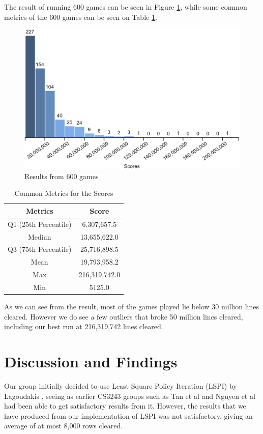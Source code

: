 \documentclass[a4paper,12pt,twocolumn]{article}
\begin{document}
The result of running 600 games can be seen in Figure \ref{score_histogram},
while some common metrics of the 600 games can be seen on Table \ref{metric_scores}.

\begin{figure}[h]
    \centering
    \includegraphics[scale=0.15]{games_600_histogram.png}
    \caption{Results from 600 games}
    \label{score_histogram}
\end{figure}

\begin{table}[h]
    \centering
	\begin{tabular}{|c|c|}
		\hline
		\textbf{Metrics}   & \textbf{Score}     \\
		\hline
		Q1 (25th Percentile)  & 6,307,657.5 \\
		\hline
		Median         & 13,655,622.0  \\
		\hline
		Q3 (75th Percentile)      & 25,716,898.5 \\
		\hline
		Mean & 19,793,958.2 \\
		\hline
		Max     & 216,319,742.0  \\
		\hline
		Min          & 5125.0 \\
		\hline
	\end{tabular}
	\caption{Common Metrics for the Scores}
	\label{metric_scores}
\end{table}

As we can see from the result, most of the games played lie below 30 million lines
cleared. However we do see a few outliers that broke 50 million lines cleared, including
our best run at 216,319,742 lines cleared.

\section{Discussion and Findings}
\label{discussion_n_findings}
Our group initially decided to use Least Square Policy Iteration (LSPI) by Lagoudakis \cite{lagoudakis},
seeing as earlier CS3243 groups such as Tan et al \cite{shawntan} and Nguyen et al \cite{nhannguyen}
had been able to get satisfactory results from it. However, the results that we have
produced from our implementation of LSPI was not satisfactory, giving an average of
at most 8,000 rows cleared.\\
\end{document}
